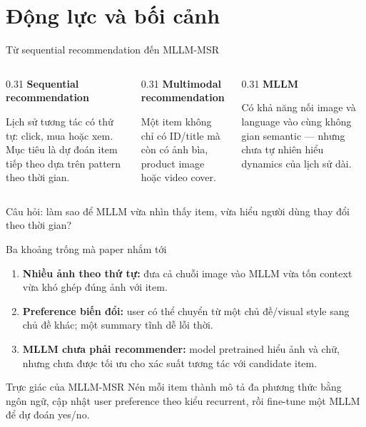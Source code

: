 \section{Động lực và bối cảnh}
\begin{frame}{Từ sequential recommendation đến MLLM-MSR}
  \begin{columns}[T,onlytextwidth]
    \begin{column}{0.31\textwidth}\centering
      \textbf{Sequential recommendation}\par\vspace{0.2cm}
      \small Lịch sử tương tác có thứ tự: click, mua hoặc xem. Mục tiêu là dự đoán item tiếp theo dựa trên pattern theo thời gian.
    \end{column}
    \begin{column}{0.31\textwidth}\centering
      \textbf{Multimodal recommendation}\par\vspace{0.2cm}
      \small Một item không chỉ có ID/title mà còn có ảnh bìa, product image hoặc video cover.
    \end{column}
    \begin{column}{0.31\textwidth}\centering
      \textbf{MLLM}\par\vspace{0.2cm}
      \small Có khả năng nối image và language vào cùng không gian semantic — nhưng chưa tự nhiên hiểu dynamics của lịch sử dài.
    \end{column}
  \end{columns}
  \vfill\centering\Large\textcolor{Logo1}{Câu hỏi: làm sao để MLLM vừa nhìn thấy item, vừa hiểu người dùng thay đổi theo thời gian?}
\end{frame}

\begin{frame}{Ba khoảng trống mà paper nhắm tới}
  \begin{enumerate}
    \item \textbf{Nhiều ảnh theo thứ tự:} đưa cả chuỗi image vào MLLM vừa tốn context vừa khó ghép đúng ảnh với item.
    \item \textbf{Preference biến đổi:} user có thể chuyển từ một chủ đề/visual style sang chủ đề khác; một summary tĩnh dễ lỗi thời.
    \item \textbf{MLLM chưa phải recommender:} model pretrained hiểu ảnh và chữ, nhưng chưa được tối ưu cho xác suất tương tác với candidate item.
  \end{enumerate}
  \vspace{0.25cm}\begin{block}{Trực giác của MLLM-MSR}
    Nén mỗi item thành mô tả đa phương thức bằng ngôn ngữ, cập nhật user preference theo kiểu recurrent, rồi fine-tune một MLLM để dự đoán yes/no.
  \end{block}
\end{frame}


